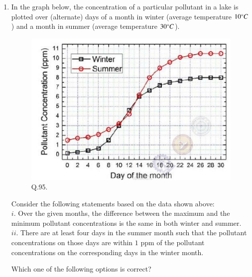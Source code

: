 \documentclass[journal,12pt,onecolumn]{IEEEtran}
\theoremstyle{remark}
\begin{document}
\begin{enumerate}
    \item In the graph below, the concentration of a particular pollutant in a lake is plotted over (alternate) days of a month in winter (average temperature $10\degree C$) and a month in summer (average temperature $30\degree C$).
    
    \begin{figure}[H]
        \centering
        \includegraphics[width=0.5\columnwidth]{Figs/fig_14.png}
        \caption{Q.95.}
        \label{fig:placeholder_14}
    \end{figure}
    
    Consider the following statements based on the data shown above:\\
    $i$. Over the given months, the difference between the maximum and the minimum pollutant concentrations is the same in both winter and summer. \\
    $ii$. There are at least four days in the summer month such that the pollutant concentrations on those days are within $1$ ppm of the pollutant concentrations on the corresponding days in the winter month.
    
    Which one of the following options is correct? \hfill{}
        \begin{enumerate}
        \end{enumerate}
    


\end{enumerate}
\end{document}
